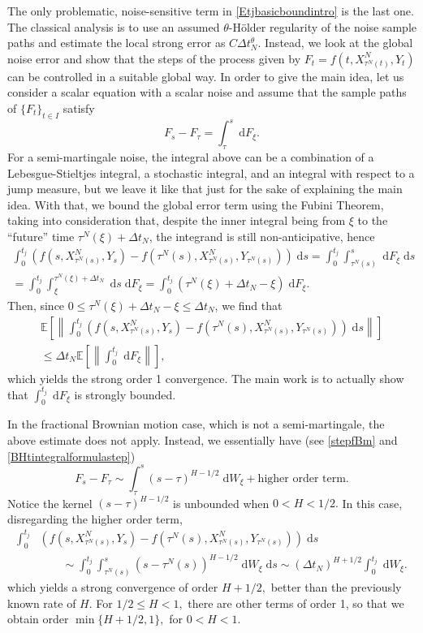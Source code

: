 \documentclass[reqno,12pt]{amsart}
\theoremstyle{plain} %
\theoremstyle{definition} %
\begin{document}
The only problematic, noise-sensitive term in \cref{Etjbasicboundintro} is the last one. The classical analysis is to use an assumed $\theta$-H\"older regularity of the noise sample paths and estimate the local strong error as $C\Delta t_N^{\theta}.$ Instead, we look at the global noise error and show that the steps of the process given by $F_t = f(t, X_{\tau^N(t)}^N, Y_t)$ can be controlled in a suitable global way. In order to give the main idea, let us consider a scalar equation with a scalar noise and assume that the sample paths of $\{F_t\}_{t\in I}$ satisfy
\[
    F_s - F_\tau = \int_\tau^s \;\mathrm{d}F_\xi.
\]
For a semi-martingale noise, the integral above can be a combination of a Lebesgue-Stieltjes integral, a stochastic integral, and an integral with respect to a jump measure, but we leave it like that just for the sake of explaining the main idea. With that, we bound the global error term using the Fubini Theorem, taking into consideration that, despite the inner integral being from $\xi$ to the ``future'' time $\tau^N(\xi) + \Delta t_N$, the integrand is still non-anticipative, hence
\begin{multline*}
    \int_0^{t_j} \left( f(s, X_{\tau^N(s)}^N, Y_s) - f(\tau^N(s), X_{\tau^N(s)}^N, Y_{\tau^N(s)}) \right)\;\mathrm{d}s = \int_0^{t_j} \int_{\tau^N(s)}^s \;\mathrm{d}  F_\xi\;\mathrm{d}s \\
    = \int_0^{t_j} \int_{\xi}^{\tau^N(\xi) + \Delta t_N} \;\mathrm{d}s \;\mathrm{d} F_\xi  = \int_0^{t_j} (\tau^N(\xi) + \Delta t_N - \xi) \;\mathrm{d} F_\xi.
\end{multline*}
Then, since $0 \leq \tau^N(\xi) + \Delta t_N - \xi \leq \Delta t_N$, we find that
\begin{multline*}
    \mathbb{E}\left[\left\| \int_0^{t_j} \left( f(s, X_{\tau^N(s)}^N, Y_s) - f(\tau^N(s), X_{\tau^N(s)}^N, Y_{\tau^N(s)}) \right)\;\mathrm{d}s\right\|\right] \\
    \leq \Delta t_N\mathbb{E}\left[\left\| \int_0^{t_j} \;\mathrm{d} F_\xi \right\|\right],
\end{multline*}
which yields the strong order 1 convergence. The main work is to actually show that $\int_0^{t_j} \;\mathrm{d} F_\xi$ is strongly bounded.

In the fractional Brownian motion case, which is not a semi-martingale, the above estimate does not apply. Instead, we essentially have (see \cref{stepfBm} and \cref{BHtintegralformulastep})
\[
    F_s - F_\tau \sim \int_\tau^s (s-\tau)^{H-1/2}\;\mathrm{d}W_\xi + \text{higher order term}.
\]
Notice the kernel $(s-\tau)^{H-1/2}$ is unbounded when $0<H<1/2.$ In this case, disregarding the higher order term,
\begin{align*}
    \int_0^{t_j} & \left( f(s, X_{\tau^N(s)}^N, Y_s) - f(\tau^N(s), X_{\tau^N(s)}^N, Y_{\tau^N(s)}) \right)\;\mathrm{d}s \\ 
    & \qquad \sim \int_0^{t_j} \int_{\tau^N(s)}^s (s-\tau^N(s))^{H-1/2} \;\mathrm{d} W_\xi\;\mathrm{d}s \sim (\Delta t_N)^{H+1/2} \int_0^{t_j} \;\mathrm{d} W_\xi.
\end{align*}
which yields a strong convergence of order $H + 1/2,$ better than the previously known rate of $H.$ For $1/2 \leq H < 1,$ there are other terms of order 1, so that we obtain order $\min\{H+1/2, 1\},$ for $0 < H < 1.$
\end{document}
